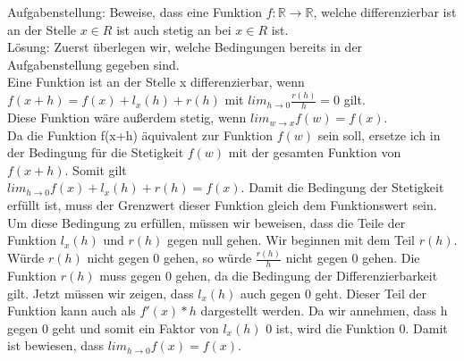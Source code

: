 \documentclass{article}
\begin{document}
Aufgabenstellung:
Beweise, dass eine Funktion $f:\mathbb{R} \rightarrow \mathbb{R}$, welche differenzierbar ist an der Stelle $x \in R$ ist auch stetig an bei $x \in R$ ist.\\
Lösung:
Zuerst überlegen wir, welche Bedingungen bereits in der Aufgabenstellung gegeben sind. \\
Eine Funktion ist an der Stelle x differenzierbar, wenn\\
$f(x+h)=f(x)+l_x(h)+ r(h)$ mit $lim_{h\rightarrow0} \frac{r(h)}{h}= 0$ 
gilt.\\
Diese Funktion wäre außerdem stetig, wenn $lim_{w\rightarrow x} f(w)=f(x)$.\\
Da die Funktion f(x+h) äquivalent zur Funktion $f(w)$ sein soll, ersetze ich in der Bedingung für die Stetigkeit $f(w)$ mit der gesamten Funktion von $f(x+h)$.  
Somit gilt \\$lim_{h\rightarrow0}f(x)+l_x(h)+r(h)=f(x)$.
Damit die Bedingung der Stetigkeit erfüllt ist, muss der Grenzwert dieser Funktion gleich dem Funktionswert sein. Um diese Bedingung zu erfüllen, müssen wir beweisen, dass die Teile der Funktion $l_x(h)$ und $r(h)$ gegen null gehen. Wir beginnen mit dem Teil $r(h)$.  Würde $r(h)$ nicht gegen 0 gehen, so würde $\frac{r(h)}{h}$ nicht gegen 0 gehen. Die Funktion $r(h)$ muss gegen 0 gehen, da die Bedingung der Differenzierbarkeit gilt. Jetzt müssen wir zeigen, dass $l_x(h)$ auch gegen 0 geht. Dieser Teil der Funktion kann auch als $f'(x)*h$ dargestellt werden. Da wir annehmen, dass h gegen 0 geht und somit ein Faktor von $l_x(h)$ 0 ist, wird die Funktion 0. Damit ist bewiesen, dass $lim_{h\rightarrow0}f(x)=f(x)$.
\end{document}
